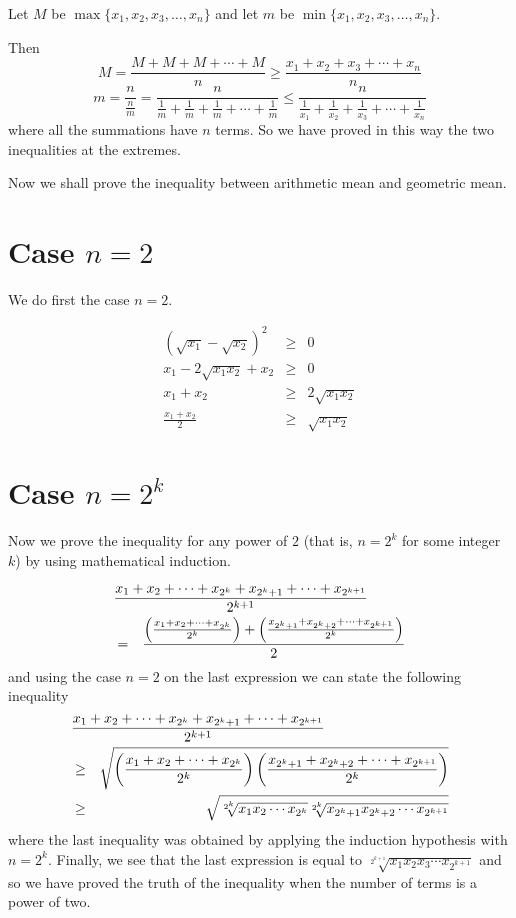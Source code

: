\documentclass[12pt]{article}
\begin{document}
Let $M$ be $\max\{x_1,x_2,x_3,\ldots,x_n\}$ and let $m$ be $\min\{x_1,x_2,x_3,\ldots,x_n\}$.

Then
$$M=\frac{M+M+M+\cdots+M}{n}\geq\frac{x_1+x_2+x_3+\cdots+x_n}{n}$$
$$m=\frac{n}{\frac{n}{m}}=
\frac{n}{\frac{1}{m}+\frac{1}{m}+\frac{1}{m}+\cdots+\frac{1}{m}}
\leq\frac{n}{\frac{1}{x_1}+\frac{1}{x_2}+\frac{1}{x_3}+\cdots+\frac{1}{x_n}}$$
where all the summations have $n$ terms.
So we have proved in this way the two inequalities at the extremes.

Now we shall prove the inequality between arithmetic mean and geometric mean.

\section{Case $n=2$}
We do first the case $n=2$.

\begin{eqnarray*}
(\sqrt{x_1}-\sqrt{x_2})^2 &\geq& 0\\
x_1-2\sqrt{x_1x_2}+x_2&\geq&0\\
x_1+x_2&\geq&2\sqrt{x_1x_2}\\
\frac{x_1+x_2}{2}&\geq&\sqrt{x_1x_2}
\end{eqnarray*}

\section{Case $n=2^k$}
Now we prove the inequality for any power of $2$ (that is, $n=2^k$ for some integer $k$) by using mathematical induction. 

\begin{eqnarray*}
\lefteqn{
    \frac{x_1+x_2+\cdots+x_{2^k}+x_{2^k+1}+\cdots+x_{2^{k+1}}}{2^{k+1}}
}\\
&=&
\frac{\left(
   \frac{x_1+x_2+\cdots+x_{2^k}}{2^k}
\right)
+
\left(
   \frac{x_{2^k+1}+x_{2^k+2}+\cdots+x_{2^{k+1}}}{2^k}
\right)}
{2}
\end{eqnarray*}
and using the case $n=2$ on the last expression we can state the following inequality
\begin{eqnarray*}
\lefteqn{
    \frac{x_1+x_2+\cdots+x_{2^k}+x_{2^k+1}+\cdots+x_{2^{k+1}}}{2^{k+1}}
}\\
&\ge&
\sqrt{
\left(
   \frac{x_1+x_2+\cdots+x_{2^k}}{2^k}
\right)
\left(
   \frac{x_{2^k+1}+x_{2^k+2}+\cdots+x_{2^{k+1}}}{2^k}
\right)
}\\
&\ge&
\sqrt{
\sqrt[2^k]{x_1x_2\cdots x_{2^k}}
\sqrt[2^k]{x_{2^k+1}x_{2^k+2}\cdots x_{2^{k+1}}}
}
\end{eqnarray*}
where the last inequality was obtained by applying the induction hypothesis with $n=2^k$. Finally, we see that the last expression is equal to
$\sqrt[2^{k+1}]{x_1x_2x_3\cdots x_{2^{k+1}}}$
and so we have proved the truth of the inequality when the number of terms is a power of two.
\end{document}
